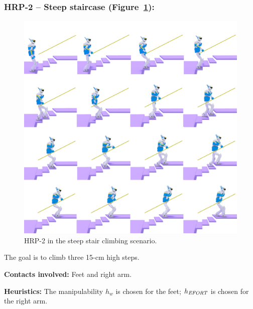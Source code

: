 \subsubsection{HRP-2 -- Steep staircase (Figure~\ref{fig:stair_robust}):}

\begin{figure}
  \centering
  \includegraphics[width=1\linewidth]{figures/stair}
  \caption{
           HRP-2 in the steep stair climbing scenario. }
		   \label{fig:stair_robust}
\end{figure}

The goal is to climb three 15-cm high steps.

\noindent\textbf{Contacts involved:} Feet and right arm.

\noindent\textbf{Heuristics:} The manipulability $h_w$ is chosen for the feet; $h_{\textrm{\it EFORT}}$ is chosen for the right arm.

